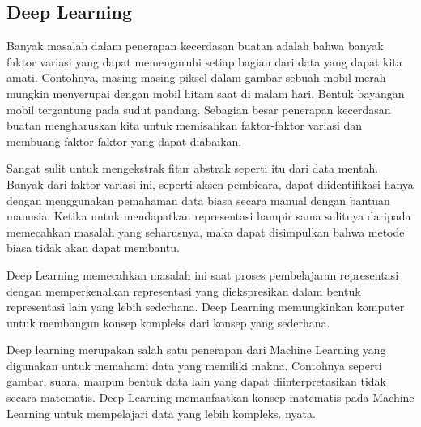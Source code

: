 \documentclass[./skripsi.tex]{subfiles}
\begin{document}
\subsection{Deep Learning}
\par 
Banyak masalah dalam penerapan kecerdasan buatan adalah bahwa banyak faktor variasi yang dapat memengaruhi setiap bagian dari data yang dapat kita amati. Contohnya, masing-masing piksel dalam gambar sebuah mobil merah mungkin menyerupai dengan mobil hitam saat di malam hari. Bentuk bayangan mobil tergantung pada sudut pandang. Sebagian besar penerapan kecerdasan buatan mengharuskan kita untuk memisahkan faktor-faktor variasi dan membuang faktor-faktor yang dapat diabaikan.
\par Sangat sulit untuk mengekstrak fitur abstrak seperti itu dari data mentah. Banyak dari faktor variasi ini, seperti aksen pembicara, dapat diidentifikasi hanya dengan menggunakan pemahaman data biasa secara manual dengan bantuan manusia. Ketika untuk mendapatkan representasi hampir sama sulitnya daripada memecahkan masalah yang seharusnya, maka dapat disimpulkan bahwa metode biasa tidak akan dapat membantu.
\par Deep Learning memecahkan masalah ini saat proses pembelajaran representasi dengan memperkenalkan representasi yang diekspresikan dalam bentuk representasi lain yang lebih sederhana. Deep Learning memungkinkan komputer untuk membangun konsep kompleks dari konsep yang sederhana.
\par Deep learning merupakan salah satu penerapan dari Machine Learning yang digunakan untuk memahami data yang memiliki makna. Contohnya seperti gambar, suara, maupun bentuk data lain yang dapat diinterpretasikan tidak secara matematis. Deep Learning memanfaatkan konsep matematis pada Machine Learning untuk mempelajari data yang lebih kompleks. nyata.\cite{goodfellow2016deep}
\end{document}
